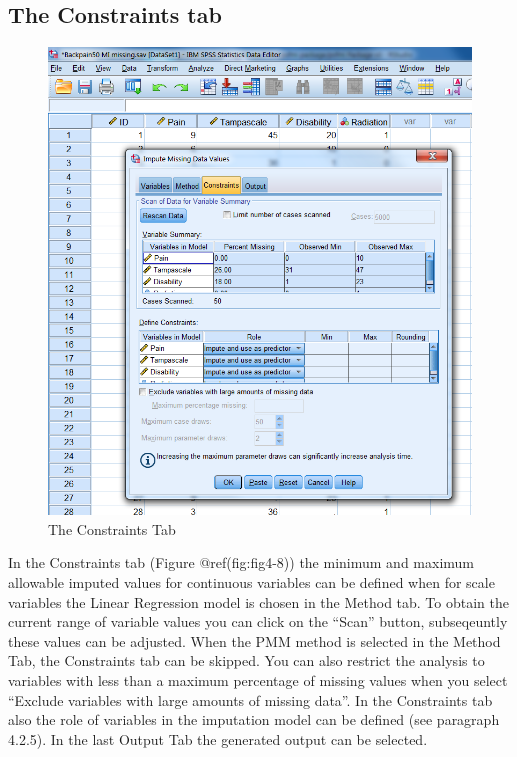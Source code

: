 \documentclass[
]{book}
\begin{document}
\hypertarget{the-constraints-tab}{%
\subsection{The Constraints tab}\label{the-constraints-tab}}

\begin{figure}

{\centering \includegraphics[width=0.9\linewidth]{images/fig4.8} 

}

\caption{The Constraints Tab}\label{fig:fig4-8}
\end{figure}

In the Constraints tab (Figure @ref(fig:fig4-8)) the minimum and maximum
allowable imputed values for continuous variables can be defined when
for scale variables the Linear Regression model is chosen in the Method
tab. To obtain the current range of variable values you can click on the
``Scan'' button, subseqeuntly these values can be adjusted. When the PMM
method is selected in the Method Tab, the Constraints tab can be
skipped. You can also restrict the analysis to variables with less than
a maximum percentage of missing values when you select ``Exclude
variables with large amounts of missing data''. In the Constraints tab
also the role of variables in the imputation model can be defined (see
paragraph 4.2.5). In the last Output Tab the generated output can be
selected.
\end{document}
